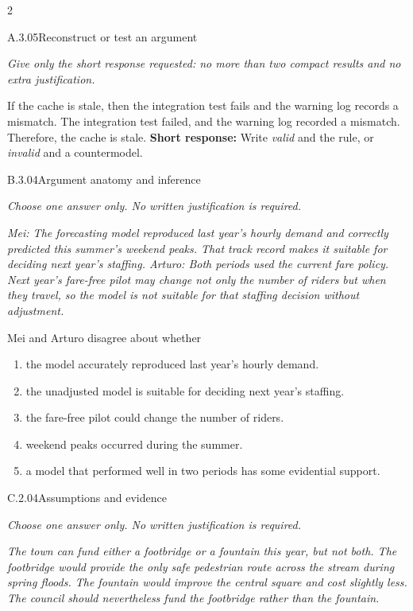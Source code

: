 \documentclass[9pt]{extarticle}
\newcommand{\choice}[1]{\item #1}
\begin{document}
\begin{multicols}{2}
\begin{DenseCoreProblem}{A.3.05}{Reconstruct or test an argument}
{\scriptsize\textit{Give only the short response requested: no more than two compact results and no extra justification.}\par}
If the cache is stale, then the integration test fails and the warning log records a mismatch. The integration test failed, and the warning log recorded a mismatch. Therefore, the cache is stale.
\textbf{Short response:} Write \emph{valid} and the rule, or \emph{invalid} and a countermodel.
\end{DenseCoreProblem}
\begin{DenseCoreProblem}{B.3.04}{Argument anatomy and inference}
{\scriptsize\textit{Choose one answer only. No written justification is required.}\par}
\emph{Mei: The forecasting model reproduced last year's hourly demand and correctly predicted this summer's weekend peaks. That track record makes it suitable for deciding next year's staffing. Arturo: Both periods used the current fare policy. Next year's fare-free pilot may change not only the number of riders but when they travel, so the model is not suitable for that staffing decision without adjustment.}

Mei and Arturo disagree about whether
\begin{enumerate}[label=(\alph*)]
  \choice{the model accurately reproduced last year's hourly demand.}
  \choice{the unadjusted model is suitable for deciding next year's staffing.}
  \choice{the fare-free pilot could change the number of riders.}
  \choice{weekend peaks occurred during the summer.}
  \choice{a model that performed well in two periods has some evidential support.}
\end{enumerate}
\end{DenseCoreProblem}
\columnbreak
\begin{DenseCoreProblem}{C.2.04}{Assumptions and evidence}
{\scriptsize\textit{Choose one answer only. No written justification is required.}\par}
\emph{The town can fund either a footbridge or a fountain this year, but not both. The footbridge would provide the only safe pedestrian route across the stream during spring floods. The fountain would improve the central square and cost slightly less. The council should nevertheless fund the footbridge rather than the fountain.}


\end{DenseCoreProblem}
\end{multicols}
\end{document}
